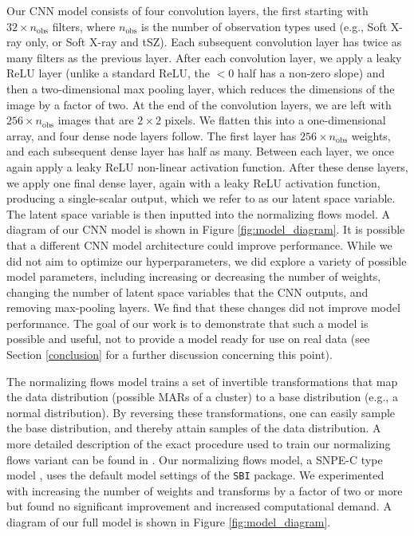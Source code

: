 \documentclass[twocolumn, linenumbers, 11pt]{aastex63}%
\begin{document}
Our CNN model consists of four convolution layers, the first starting with $32\times n_{\mathrm{obs}}$ filters, where $n_{\mathrm{obs}}$ is the number of observation types used (e.g., Soft X-ray only, or Soft X-ray and tSZ). Each subsequent convolution layer has twice as many filters as the previous layer. After each convolution layer, we apply a leaky ReLU layer \citep{LeakyReLU_2015} (unlike a standard ReLU, the $<0$ half has a non-zero slope) and then a two-dimensional max pooling layer, which reduces the dimensions of the image by a factor of two. At the end of the convolution layers, we are left with $256\times n_{\mathrm{obs}}$ images that are $2\times2$ pixels. We flatten this into a one-dimensional array, and four dense node layers follow. The first layer has $256\times n_{\mathrm{obs}}$ weights, and each subsequent dense layer has half as many. Between each layer, we once again apply a leaky ReLU non-linear activation function. After these dense layers, we apply one final dense layer, again with a leaky ReLU activation function, producing a single-scalar output, which we refer to as our latent space variable. The latent space variable is then inputted into the normalizing flows model. A diagram of our CNN model is shown in Figure \ref{fig:model_diagram}. It is possible that a different CNN model architecture could improve performance. While we did not aim to optimize our hyperparameters, we did explore a variety of possible model parameters, including increasing or decreasing the number of weights, changing the number of latent space variables that the CNN outputs, and removing max-pooling layers. We find that these changes did not improve model performance. The goal of our work is to demonstrate that such a model is possible and useful, not to provide a model ready for use on real data (see Section \ref{conclusion} for a further discussion concerning this point). 

The normalizing flows model trains a set of invertible transformations that map the data distribution (possible MARs of a cluster) to a base distribution (e.g., a normal distribution). By reversing these transformations, one can easily sample the base distribution, and thereby attain samples of the data distribution. A more detailed description of the exact procedure used to train our normalizing flows variant can be found in \citet{Greenberg_2019}. Our normalizing flows model, a SNPE-C type model \citep[][see also the \texttt{SBI} documentation]{Papamakarios_2018, Greenberg_2019}, uses the default model settings of the \texttt{SBI} package. We experimented with increasing the number of weights and transforms by a factor of two or more but found no significant improvement and increased computational demand. A diagram of our full model is shown in Figure \ref{fig:model_diagram}. 
\end{document}
